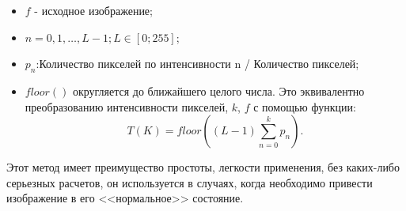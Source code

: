 \begin{itemize}
	\item $f$ - исходное изображение;
	\item $n=0,1,…,L-1;L \in \left[0 ; 255\right]$;
	\item $p_n$:Количество пикселей по интенсивности  n / Количество пикселей;
	\item $floor()$ округляется до ближайшего целого числа. Это эквивалентно преобразованию интенсивности пикселей, $k$, $f$ с помощью функции:
	\begin{equation}\label{eq7}
T\left(K\right)=floor\left(\left(L-1\right)\sum^k_{n=0}p_n\right).
\end{equation}
\end{itemize}
Этот метод имеет преимущество простоты, легкости применения, без каких-либо серьезных расчетов, он используется в случаях, когда необходимо привести изображение в его <<нормальное>> состояние.
